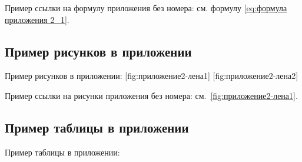 Пример ссылки на формулу приложения без номера: см. формулу \ref{eq:формула приложения 2_1}.

\subsection{Пример рисунков в приложении}

Пример рисунков в приложении:
[fig:приложение2-лена1]
[fig:приложение2-лена2]

Пример ссылки на рисунки приложения без номера: см.~\ref{fig:приложение2-лена1}.

\subsection{Пример таблицы в приложении}

Пример таблицы в приложении:

